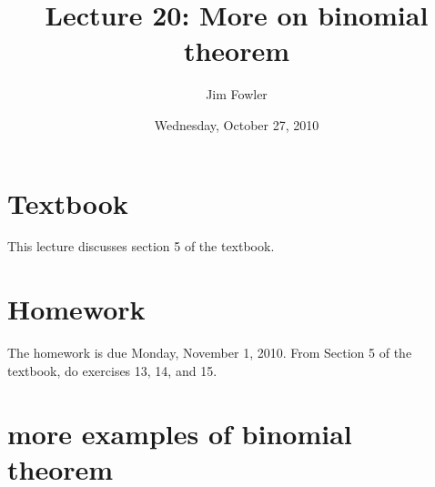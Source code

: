 \documentclass[12pt]{handout}
\title{Lecture 20: More on binomial theorem}
\author{Jim Fowler}
\date{Wednesday, October 27, 2010}
\begin{document}
\maketitle

\section*{Textbook}

This lecture discusses section 5 of the textbook.

\section*{Homework} 

The homework is due Monday, November  1, 2010.
From Section 5 of the textbook, do exercises 13, 14, and 15.

\section*{more examples of binomial theorem}
\end{document}
